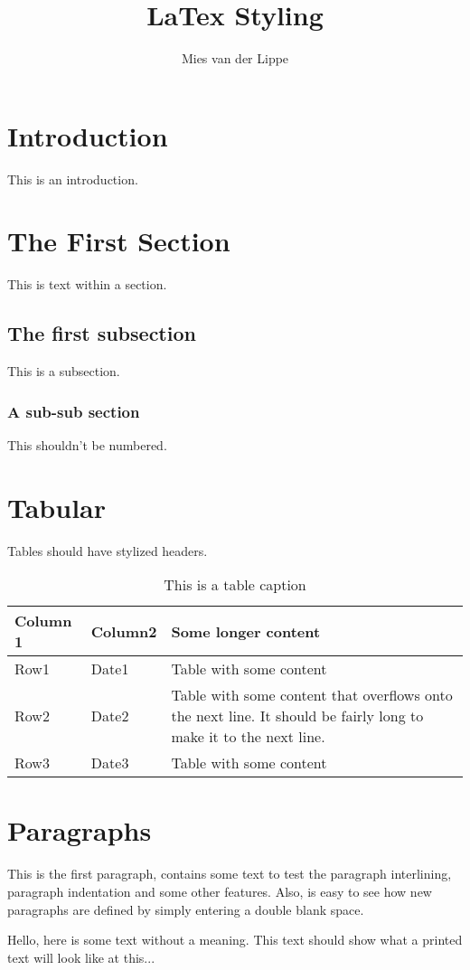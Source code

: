 \documentclass{report}
\author{Mies van der Lippe}
\title{LaTex Styling}
\begin{document}
	
	\tableofcontents
	\newpage
	\section{Introduction}
	This is an introduction. 
	
	\newpage
	
	\section{The First Section}
	This is text within a section. 
	
	\subsection{The first subsection}
	This is a subsection.
	
	\subsubsection{A sub-sub section}
	This shouldn't be numbered. 
	
	\section{Tabular}
	Tables should have stylized headers. 
	
	\begin{table}[!h]
		\begin{tabular}{|p{2cm}|p{2.5cm}|p{11cm}|} \hline
			Column 1	& Column2	& Some longer content\\\hline
			Row1	& Date1	& Table with some content\\\hline	
			Row2	& Date2	& Table with some content that overflows onto the next line. It should be fairly long to make it to the next line.\\\hline	
			Row3	& Date3	& Table with some content\\\hline	
		\end{tabular}
		\caption{This is a table caption}
	\end{table} 

	\section{Paragraphs}
	This is the first paragraph, contains some text to test the paragraph
	interlining, paragraph indentation and some other features. Also, is 
	easy to see how new paragraphs are defined by simply entering a double 
	blank space.
	
	Hello,  here  is  some  text  without  a  meaning.   This  text  should
	show what a printed text will look like at this...
	
	\listoffigures
	\listoftables
	
	
\end{document}
